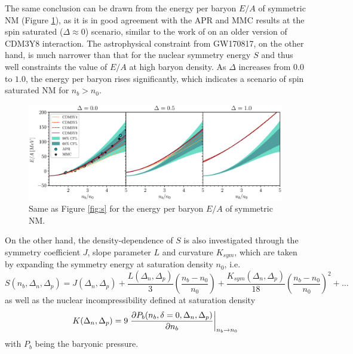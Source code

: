 The same conclusion can be drawn from the energy per baryon $E/A$ of symmetric \gls{NM} (Figure \ref{fig:eas}), as it is in good agreement with the \gls{APR} \citep{akmal1998equation} and \gls{MMC} results \citep{gandolfi2010microscopic} at the spin saturated ($\Delta\approx 0$) scenario, similar to the work of \cite{tan2021equation} on an older version of CDM3Y8 interaction. The astrophysical constraint from GW170817, on the other hand, is much narrower than that for the nuclear symmetry energy $S$ and thus well constraints the value of $E/A$ at high baryon density. As $\Delta$ increases from $0.0$ to $1.0$, the energy per baryon rises significantly, which indicates a scenario of spin saturated \gls{NM} for $n_b > n_0$.
\begin{figure}[ht!]
    \centering
    \includegraphics[width=\textwidth]{fig/EAS.eps}
    \caption{Same as Figure \ref{fig:s} for the energy per baryon $E/A$ of symmetric \gls{NM}.}
    \label{fig:eas}
\end{figure} 

On the other hand, the density-dependence of $S$ is also investigated through the symmetry coefficient $J$, slope parameter $L$ and curvature $K_{sym}$, which are taken by expanding the symmetry energy at saturation density $n_0$, i.e. \citep{tan2020spin,li2008recent,horowitz2014way,lattimer2014symmetry} 
\begin{equation}
    S(n_b, \Delta_n, \Delta_p) = J(\Delta_n, \Delta_p) + \frac{L(\Delta_n, \Delta_p)}{3} \left( \frac{n_b - n_0}{n_0} \right) + \frac{K_{sym}(\Delta_n, \Delta_p)}{18} \left( \frac{n_b - n_0}{n_0} \right)^2 + \ldots
    \label{eq:pars}
\end{equation}
as well as the nuclear incompressibility defined at saturation density
\begin{equation}
    K(\Delta_n, \Delta_p) = 9 \left.\pdv{P_b(n_b, \delta=0,\Delta_n,\Delta_p)}{n_b}\right|_{n_b \to n_0}
        \label{eq:K}
\end{equation}
with $P_b$ being the baryonic pressure.

